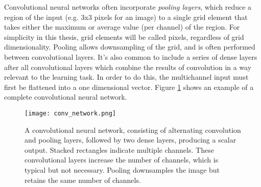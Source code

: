 Convolutional neural networks often incorporate \emph{pooling layers}, which reduce a region of the input (e.g. 3x3 pixels for an image) to a single grid element that takes either the maximum or average value (per channel) of the region. 
For simplicity in this thesis, grid elements will be called pixels, regardless of grid dimensionality.
Pooling allows downsampling of the grid, and is often performed between convolutional layers. 
It's also common to include a series of dense layers after all convolutional layers which combine the results of convolution in a way relevant to the learning task.
In order to do this, the multichannel input must first be flattened into a one dimensional vector.
Figure \ref{fig:conv_network} shows an example of a complete convolutional neural network.

\begin{figure}
	\centering
	\texttt{[image: conv\_network.png]}
	\caption{A convolutional neural network, consisting of alternating convolution and pooling layers, followed by two dense layers, producing a scalar output. Stacked rectangles indicate multiple channels. These convolutional layers increase the number of channels, which is typical but not necessary. Pooling downsamples the image but retains the same number of channels.}
	\label{fig:conv_network}
\end{figure}


